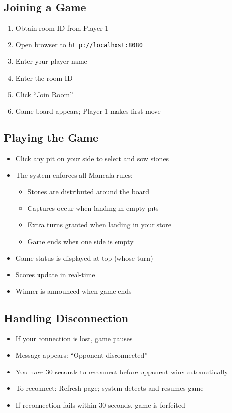\documentclass{scrartcl}
\begin{document}
\subsection{Joining a Game}

\begin{enumerate}
  \item Obtain room ID from Player 1
  \item Open browser to \texttt{http://localhost:8080}
  \item Enter your player name
  \item Enter the room ID
  \item Click ``Join Room''
  \item Game board appears; Player 1 makes first move
\end{enumerate}

\subsection{Playing the Game}

\begin{itemize}
  \item Click any pit on your side to select and sow stones
  \item The system enforces all Mancala rules:
  \begin{itemize}
    \item Stones are distributed around the board
    \item Captures occur when landing in empty pits
    \item Extra turns granted when landing in your store
    \item Game ends when one side is empty
  \end{itemize}
  \item Game status is displayed at top (whose turn)
  \item Scores update in real-time
  \item Winner is announced when game ends
\end{itemize}

\subsection{Handling Disconnection}

\begin{itemize}
  \item If your connection is lost, game pauses
  \item Message appears: ``Opponent disconnected''
  \item You have 30 seconds to reconnect before opponent wins automatically
  \item To reconnect: Refresh page; system detects and resumes game
  \item If reconnection fails within 30 seconds, game is forfeited
\end{itemize}
\end{document}
